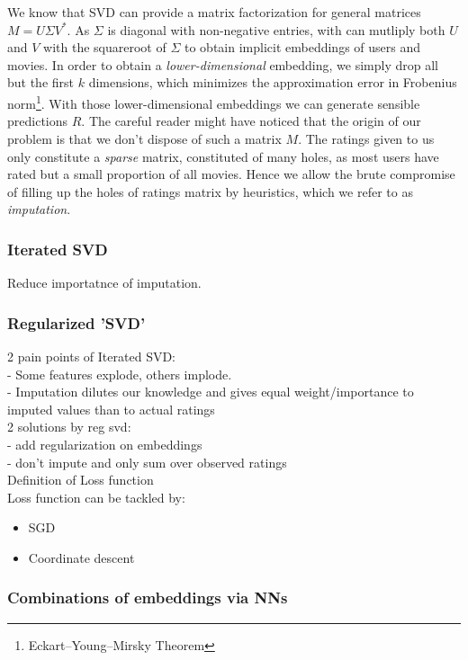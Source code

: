 \documentclass[10pt,conference,compsocconf]{IEEEtran}
\begin{document}
We know that SVD can provide a matrix factorization for general matrices $M = U \Sigma V^*$. As $\Sigma$ is diagonal with non-negative entries, with can mutliply both $U$ and $V$ with the squareroot of $\Sigma$ to obtain implicit embeddings of users and movies. In order to obtain a \emph{lower-dimensional} embedding, we simply drop all but the first $k$ dimensions, which minimizes the approximation error in Frobenius norm\footnote{Eckart–Young–Mirsky Theorem}. With those lower-dimensional embeddings we can generate sensible predictions $\hat{R}$. The careful reader might have noticed that the origin of our problem is that we don't dispose of such a matrix $M$. The ratings given to us only constitute a \emph{sparse} matrix, constituted of many holes, as most users have rated but a small proportion of all movies. Hence we allow the brute compromise of filling up the holes of ratings matrix by heuristics, which we refer to as \emph{imputation}. 

\subsubsection{Iterated SVD}
Reduce importatnce of imputation.

\subsubsection{Regularized 'SVD'}
2 pain points of Iterated SVD: \\
- Some features explode, others implode. \\
- Imputation dilutes our knowledge and gives equal weight/importance to imputed values than to actual ratings \\
2 solutions by reg svd:\\
- add regularization on embeddings\\
- don't impute and only sum over observed ratings\\
Definition of Loss function\\
Loss function can be tackled by:
\begin{itemize}
\item SGD
\item Coordinate descent
\end{itemize}
\subsubsection{Combinations of embeddings via NNs}
\end{document}

